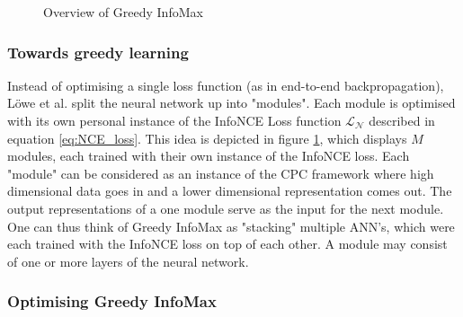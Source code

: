 \begin{figure}[h!t]
\begin{annotatedFigure}
		
		
		
		
		
	\end{annotatedFigure}
	\caption{Overview of Greedy InfoMax}
	\label{fig:gim-overview}
\end{figure}


	

\subsubsection{Towards greedy learning}
	Instead of optimising a single loss function (as in end-to-end backpropagation), Löwe et al. split the neural network up into "modules". Each module is optimised with its own personal instance of the InfoNCE Loss function $\mathcal{L_N}$ described in equation \ref{eq:NCE_loss}. This idea is depicted in figure \ref{fig:gim-overview}, which displays $M$ modules, each trained with their own instance of the InfoNCE loss. Each "module" can be considered as an instance of the CPC framework where high dimensional data goes in and a lower dimensional representation comes out. The output representations of a one module serve as the input for the next module. One can thus think of Greedy InfoMax as "stacking" multiple ANN's, which were each trained with the InfoNCE loss on top of each other. A module may consist of one or more layers of the neural network. 
	
\subsubsection{Optimising Greedy InfoMax}







